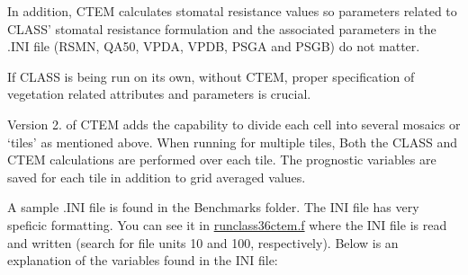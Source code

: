 In addition, C\+T\+E\+M calculates stomatal resistance values so parameters related to C\+L\+A\+S\+S’ stomatal resistance formulation and the associated parameters in the .I\+N\+I file (R\+S\+M\+N, Q\+A50, V\+P\+D\+A, V\+P\+D\+B, P\+S\+G\+A and P\+S\+G\+B) do not matter.

If C\+L\+A\+S\+S is being run on its own, without C\+T\+E\+M, proper specification of vegetation related attributes and parameters is crucial.

Version 2. of C\+T\+E\+M adds the capability to divide each cell into several mosaics or ‘tiles’ as mentioned above. When running for multiple tiles, Both the C\+L\+A\+S\+S and C\+T\+E\+M calculations are performed over each tile. The prognostic variables are saved for each tile in addition to grid averaged values.

A sample .I\+N\+I file is found in the Benchmarks folder. The I\+N\+I file has very speficic formatting. You can see it in \hyperlink{runclass36ctem_8f}{runclass36ctem.\+f} where the I\+N\+I file is read and written (search for file units 10 and 100, respectively). Below is an explanation of the variables found in the I\+N\+I file\+:


